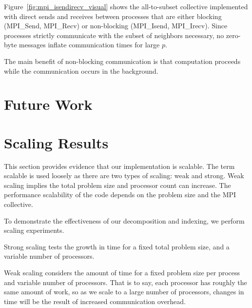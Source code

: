 \documentclass{report}
\begin{document}
Figure~\ref{fig:mpi_isendirecv_visual} shows the all-to-subset collective implemented with direct sends and receives between processes that are either blocking (MPI\_Send, MPI\_Recv) or non-blocking (MPI\_Isend, MPI\_Irecv). Since processes strictly communicate with the subset of neighbors necessary, no zero-byte messages inflate communication times for large $p$. 





The main benefit of non-blocking communication is that computation proceeds while the communication occurs in the background. 



\section{Future Work}





\section{Scaling Results} 
This section provides evidence that our implementation is scalable. The term scalable is used loosely as there are two types of scaling: weak and strong. Weak scaling implies the total problem size and processor count can increase. The performance scalability of the code depends on the problem size and the MPI collective. 

To demonstrate the effectiveness of our decomposition and indexing, we perform scaling experiments. 

Strong scaling tests the growth in time for a fixed total problem size, and a variable number of processors. 

Weak scaling considers the amount of time for a fixed problem size per process and variable number of processors. That is to say, each processor has roughly the same amount of work, so as we scale to a large number of processors, changes in time will be the result of increased communication overhead. 
\end{document}
